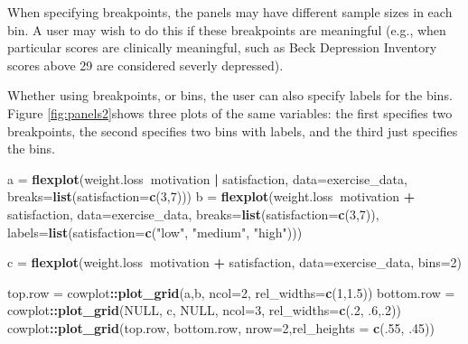 \documentclass[,]{book}
\newenvironment{Shaded}{\begin{snugshade}}{\end{snugshade}}
\newcommand{\KeywordTok}[1]{\textcolor[rgb]{0.13,0.29,0.53}{\textbf{#1}}}
\newcommand{\DataTypeTok}[1]{\textcolor[rgb]{0.13,0.29,0.53}{#1}}
\newcommand{\DecValTok}[1]{\textcolor[rgb]{0.00,0.00,0.81}{#1}}
\newcommand{\FloatTok}[1]{\textcolor[rgb]{0.00,0.00,0.81}{#1}}
\newcommand{\StringTok}[1]{\textcolor[rgb]{0.31,0.60,0.02}{#1}}
\newcommand{\OtherTok}[1]{\textcolor[rgb]{0.56,0.35,0.01}{#1}}
\newcommand{\OperatorTok}[1]{\textcolor[rgb]{0.81,0.36,0.00}{\textbf{#1}}}
\newcommand{\NormalTok}[1]{#1}
\begin{document}
When specifying breakpoints, the panels may have different sample sizes
in each bin. A user may wish to do this if these breakpoints are
meaningful (e.g., when particular scores are clinically meaningful, such
as Beck Depression Inventory scores above 29 are considered severly
depressed).

Whether using breakpoints, or bins, the user can also specify labels for
the bins. Figure \ref{fig:panels2}shows three plots of the same
variables: the first specifies two breakpoints, the second specifies two
bins with labels, and the third just specifies the bins.

\begin{Shaded}
\begin{Highlighting}[]
\NormalTok{a =}\StringTok{ }\KeywordTok{flexplot}\NormalTok{(weight.loss}\OperatorTok{~}\NormalTok{motivation }\OperatorTok{|}\StringTok{ }\NormalTok{satisfaction, }
             \DataTypeTok{data=}\NormalTok{exercise_data, }
             \DataTypeTok{breaks=}\KeywordTok{list}\NormalTok{(}\DataTypeTok{satisfaction=}\KeywordTok{c}\NormalTok{(}\DecValTok{3}\NormalTok{,}\DecValTok{7}\NormalTok{))) }
\NormalTok{b =}\StringTok{ }\KeywordTok{flexplot}\NormalTok{(weight.loss}\OperatorTok{~}\NormalTok{motivation }\OperatorTok{+}\StringTok{ }\NormalTok{satisfaction, }
             \DataTypeTok{data=}\NormalTok{exercise_data, }
             \DataTypeTok{breaks=}\KeywordTok{list}\NormalTok{(}\DataTypeTok{satisfaction=}\KeywordTok{c}\NormalTok{(}\DecValTok{3}\NormalTok{,}\DecValTok{7}\NormalTok{)), }
             \DataTypeTok{labels=}\KeywordTok{list}\NormalTok{(}\DataTypeTok{satisfaction=}\KeywordTok{c}\NormalTok{(}\StringTok{"low"}\NormalTok{, }\StringTok{"medium"}\NormalTok{, }\StringTok{"high"}\NormalTok{)))}

\NormalTok{c =}\StringTok{ }\KeywordTok{flexplot}\NormalTok{(weight.loss}\OperatorTok{~}\NormalTok{motivation }\OperatorTok{+}\StringTok{ }\NormalTok{satisfaction, }
             \DataTypeTok{data=}\NormalTok{exercise_data, }
             \DataTypeTok{bins=}\DecValTok{2}\NormalTok{) }
\end{Highlighting}
\end{Shaded}

\begin{Shaded}
\begin{Highlighting}[]
\NormalTok{  top.row =}\StringTok{ }\NormalTok{cowplot}\OperatorTok{::}\KeywordTok{plot_grid}\NormalTok{(a,b, }\DataTypeTok{ncol=}\DecValTok{2}\NormalTok{, }\DataTypeTok{rel_widths=}\KeywordTok{c}\NormalTok{(}\DecValTok{1}\NormalTok{,}\FloatTok{1.5}\NormalTok{))}
\NormalTok{  bottom.row =}\StringTok{ }\NormalTok{cowplot}\OperatorTok{::}\KeywordTok{plot_grid}\NormalTok{(}\OtherTok{NULL}\NormalTok{, c, }\OtherTok{NULL}\NormalTok{, }\DataTypeTok{ncol=}\DecValTok{3}\NormalTok{, }\DataTypeTok{rel_widths=}\KeywordTok{c}\NormalTok{(.}\DecValTok{2}\NormalTok{, .}\DecValTok{6}\NormalTok{,.}\DecValTok{2}\NormalTok{))}
\NormalTok{  cowplot}\OperatorTok{::}\KeywordTok{plot_grid}\NormalTok{(top.row, bottom.row, }\DataTypeTok{nrow=}\DecValTok{2}\NormalTok{,}\DataTypeTok{rel_heights =} \KeywordTok{c}\NormalTok{(.}\DecValTok{55}\NormalTok{, .}\DecValTok{45}\NormalTok{))}
\end{Highlighting}
\end{Shaded}
\end{document}
